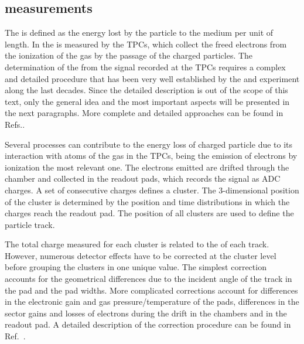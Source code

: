 \subsection{\dedx measurements}
\label{sec:hadron:dedx:meas}


The \dedx is defined as the energy lost by the
particle to the medium per unit of length. 
In \NASixtyOne the \dedx is measured by the TPCs, which collect the 
freed electrons from the ionization of the gas by the passage of the charged particles.
The determination of the \dedx from the signal recorded at the TPCs requires a complex and
detailed procedure that has been very well established by the \NAFortyNine and \NASixtyOne
experiment along the last decades. Since the detailed description 
is out of the scope of this text, only the general idea and the most important aspects
will be presented in the next paragraphs. More complete and detailed approaches
can be found in Refs.\cite{BlumBook,LeeuwenThesis,GaborVeresThesis}.

Several processes can contribute to the energy loss of charged particle due to
its interaction with atoms of the gas in the TPCs, being the emission of
electrons by ionization the most relevant one. The electrons emitted are
drifted through the chamber and collected in the readout pads, which records
the signal as ADC charges. A set of consecutive charges defines a cluster.
The 3-dimensional position of the cluster is determined by the position
and time distributions in which the charges reach the readout pad.
The position of all clusters are used to define the particle track.

The total charge measured for each cluster is related to the \dedx of each track.
However, numerous detector effects have to be corrected at the cluster level before
grouping the clusters in one unique \dedx value. The simplest correction accounts for
the geometrical differences due to the incident angle of the track in the pad and
the pad widths. More complicated corrections account for differences in the electronic
gain and gas pressure/temperature of the pads, differences in the sector gains and
losses of electrons during the drift in the chambers and in the readout pad.
A detailed description of the correction procedure can be found in Ref.~\cite{AntoniMThesis}.

